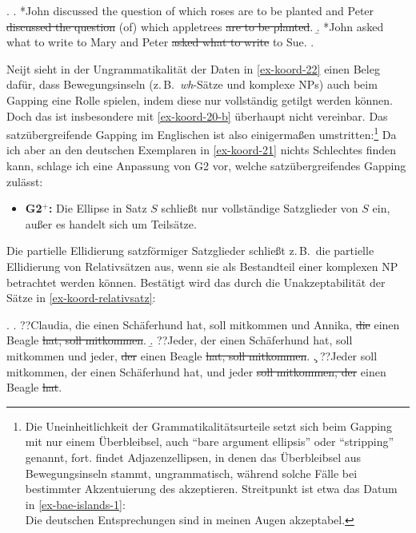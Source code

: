 \ex. \label{ex-koord-22}
\a. *John discussed the question of which roses are to be planted and Peter \sout{discussed the question} (of) which appletrees \sout{are to be planted}.\label{ex-koord-22-a}
\b. *John asked what to write to Mary and Peter \sout{asked what to write} to Sue.\label{ex-koord-22-b}
\z. \citep[153]{Neijt:79}  

Neijt sieht in der Ungrammatikalität der Daten in \ref{ex-koord-22} einen Beleg dafür, dass Bewegungsinseln (z.\,B.\  \textit{wh}-Sätze und komplexe NPs) auch beim Gapping eine Rolle spielen, indem diese nur vollständig getilgt werden können. Doch das ist insbesondere mit \ref{ex-koord-20-b} überhaupt nicht vereinbar. Das satzübergreifende Gapping  im Englischen ist also einigerma\ss en umstritten:\footnote{Die Uneinheitlichkeit der Grammatikalitätsurteile setzt sich beim Gapping mit nur einem Überbleibsel, auch "`bare argument ellipsis"' oder "`stripping"' genannt, fort. \citet[688f]{Merchant:04} findet Adjazenzellipsen, in denen das Überbleibsel aus Bewegungsinseln stammt, ungrammatisch, während  \citet[244f]{Culicover:Jackendoff:05} solche Fälle bei bestimmter Akzentuierung des  akzeptieren. Streitpunkt ist etwa das Datum in \ref{ex-bae-islands-1}:\\
Die deutschen Entsprechungen sind in meinen Augen akzeptabel.} Da ich aber an den deutschen Exemplaren in \ref{ex-koord-21} nichts Schlechtes finden kann, schlage ich eine Anpassung von G2 vor, welche satzübergreifendes Gapping zulässt: 
\begin{itemize}
  \item[] {\bf G2$^+$:} Die Ellipse in Satz $S$ schlie\ss t nur vollständige Satzglieder von $S$ ein, au\ss er es handelt sich um Teilsätze.
\end{itemize}
Die partielle Ellidierung satzförmiger Satzglieder schlie\ss t z.\,B.\  die partielle Ellidierung von Relativsätzen aus, wenn sie als Bestandteil einer komplexen NP betrachtet werden können. Bestätigt wird das durch die Unakzeptabilität der Sätze in \ref{ex-koord-relativsatz}:

\ex. \label{ex-koord-relativsatz}
\a. ??Claudia, die einen Schäferhund hat, soll mitkommen und Annika, \sout{die} einen Beagle \sout{hat, soll mitkommen}.
\b. ??Jeder, der einen Schäferhund hat, soll mitkommen und jeder, \sout{der} einen Beagle \sout{hat, soll mitkommen}.
\c. ??Jeder soll mitkommen, der einen Schäferhund hat, und jeder \sout{soll mitkommen, der} einen Beagle \sout{hat}.\label{ex-koord-relativsatz-c}

